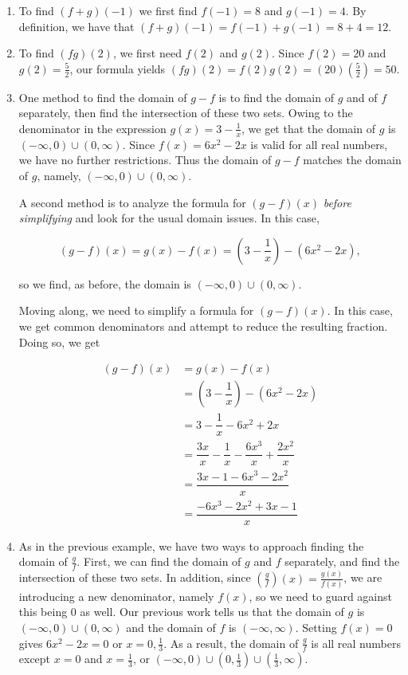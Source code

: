 {
\begin{enumerate}

\item  To find $(f+g)(-1)$ we first find $f(-1) = 8$ and $g(-1) = 4$. By definition, we have that $(f+g)(-1) = f(-1) + g(-1) = 8+4 = 12$.


\item To find $(fg)(2)$, we first need $f(2)$ and $g(2)$. Since $f(2) = 20$ and $g(2) = \frac{5}{2}$, our formula yields $(fg)(2) = f(2) g(2) = (20)\left(\frac{5}{2}\right) = 50$.

\item One method to find the domain of $g-f$ is to find the domain of $g$ and of $f$ separately, then find the intersection of these two sets.  Owing to the denominator in the expression $g(x) = 3 - \frac{1}{x}$, we get that the domain of $g$ is $(-\infty, 0) \cup (0, \infty)$.  Since $f(x) = 6x^2-2x$ is valid for all real numbers, we have no further restrictions.  Thus the domain of $g-f$ matches the domain of $g$, namely, $(-\infty, 0) \cup (0, \infty)$.

A second method is to analyze the formula for $(g-f)(x)$ \textit{before simplifying} and look for the usual domain issues.  In this case, 

\[
 (g-f)(x) = g(x) - f(x) = \left(3-\dfrac{1}{x}\right) - \left(6x^2 - 2x\right),
\]

so we find, as before, the domain is $(-\infty, 0) \cup (0, \infty)$.

Moving along, we need to simplify a formula for $(g-f)(x)$.  In this case, we get common denominators and attempt to reduce the resulting fraction.  Doing so, we get

\begin{align*}
(g-f)(x) & =  g(x) - f(x)  \\
         & =  \left(3-\dfrac{1}{x}\right) - \left(6x^2 - 2x\right) \\[5pt]
         & =  3 - \dfrac{1}{x} - 6x^2 + 2x  \\[5pt]
         & =  \dfrac{3x}{x} - \dfrac{1}{x} - \dfrac{6x^3}{x} + \dfrac{2x^2}{x}  \tag*{get common denominators} \\[5pt]
         & =  \dfrac{3x - 1 - 6x^3 - 2x^2}{x}  \\[5pt]
         & =  \dfrac{-6x^3-2x^2+3x-1}{x}
\end{align*}

\drawexampleline

\item  As in the previous example, we have two ways to approach finding the domain of $\frac{g}{f}$.  First, we can find the domain of $g$ and $f$ separately, and find the intersection of these two sets.  In addition, since $\left(\frac{g}{f}\right)(x) = \frac{g(x)}{f(x)}$, we are introducing a new denominator, namely $f(x)$, so we need to guard against this being $0$ as well.  Our previous work tells us that the domain of $g$ is $(-\infty, 0) \cup (0, \infty)$ and the domain of $f$ is $(-\infty, \infty)$.  Setting $f(x) = 0$ gives $6x^2 - 2x = 0$ or $x = 0, \frac{1}{3}$.  As a result, the domain of $\frac{g}{f}$ is all real numbers except $x = 0$ and $x = \frac{1}{3}$, or $(-\infty, 0) \cup \left(0, \frac{1}{3} \right) \cup \left( \frac{1}{3}, \infty \right)$.


\end{enumerate}}
